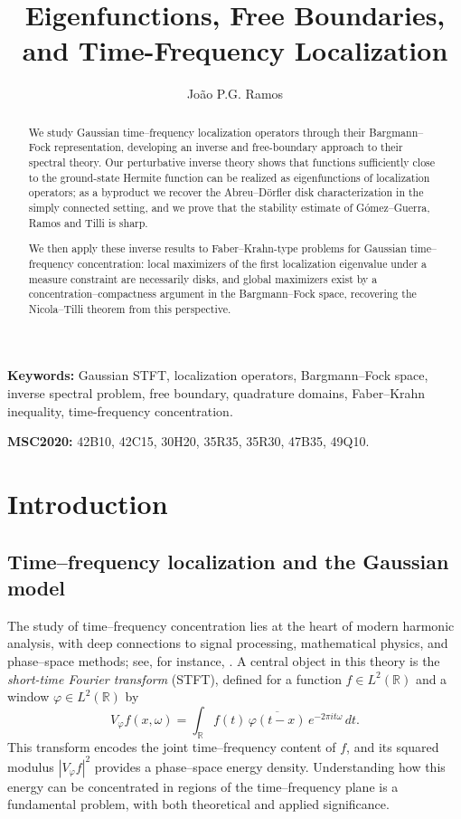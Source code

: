 \documentclass[a4paper,11pt,reqno]{amsart}
\title[Time-frequency localization]{Eigenfunctions, Free Boundaries, and Time-Frequency Localization}
\author{Jo{\~a}o P.G. Ramos}
\numberwithin{equation}{section}
\theoremstyle{plain} %
\theoremstyle{definition} %
\theoremstyle{remark}
\begin{document}
\maketitle 
\begin{abstract}
We study Gaussian time--frequency localization operators through their Bargmann--Fock representation, developing an inverse and free-boundary approach to their spectral theory. Our perturbative inverse theory shows that functions sufficiently close to the ground-state Hermite function can be realized as eigenfunctions of localization operators; as a byproduct we recover the Abreu--D\"orfler disk characterization in the simply connected setting, and we prove that the stability estimate of G\'omez--Guerra, Ramos and Tilli is sharp.

We then apply these inverse results to Faber--Krahn-type problems for Gaussian time--frequency concentration: local maximizers of the first localization eigenvalue under a measure constraint are necessarily disks, and global maximizers exist by a concentration--compactness argument in the Bargmann--Fock space, recovering the Nicola--Tilli theorem from this perspective.
\end{abstract}

\noindent\textbf{Keywords:} Gaussian STFT, localization operators, Bargmann--Fock space, inverse spectral problem, free boundary, quadrature domains, Faber--Krahn inequality, time-frequency concentration.

\medskip

\noindent\textbf{MSC2020:} 42B10, 42C15, 30H20, 35R35, 35R30, 47B35, 49Q10.


\section{Introduction}

\subsection{Time--frequency localization and the Gaussian model}

The study of time--frequency concentration lies at the heart of modern harmonic analysis, with deep connections to signal processing, mathematical physics, and phase--space methods; see, for instance, \cite{Grochenig,Mallat,Folland}. A central object in this theory is the \emph{short-time Fourier transform} (STFT), defined for a function $f \in L^2(\mathbb R)$ and a window $\varphi \in L^2(\mathbb R)$ by
\[
V_\varphi f(x,\omega) = \int_{\mathbb R} f(t)\,\overline{\varphi(t-x)}\,e^{-2\pi i t \omega}\,dt.
\]
This transform encodes the joint time--frequency content of $f$, and its squared modulus $|V_\varphi f|^2$ provides a phase--space energy density. Understanding how this energy can be concentrated in regions of the time--frequency plane is a fundamental problem, with both theoretical and applied significance.
\end{document}
